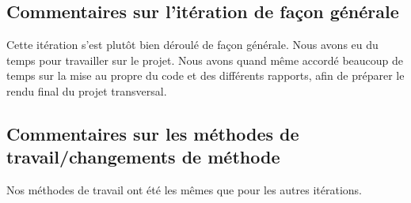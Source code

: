 \documentclass[12pt,titlepage,french]{article}
\begin{document}
\subsection{Commentaires sur l'itération de façon générale}

Cette itération s'est plutôt bien déroulé de façon générale. Nous avons eu du temps pour travailler sur le projet. Nous avons quand même accordé beaucoup de temps sur la mise au propre du code et des différents rapports, afin de préparer le rendu final du projet transversal.

\subsection{Commentaires sur les méthodes de travail/changements de méthode}

Nos méthodes de travail ont été les mêmes que pour les autres itérations.
\end{document}
